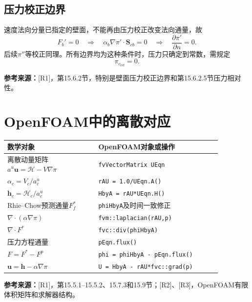 \documentclass[UTF8,12pt,a4paper]{ctexart}
\numberwithin{equation}{section}
\newcommand{\Rone}{\textnormal{[R1]}}
\newcommand{\Rtwo}{\textnormal{[R2]}}
\newcommand{\Rthree}{\textnormal{[R3]}}
\newcommand{\source}[1]{\par\smallskip\noindent\colorbox{sourcebg}{%
  \parbox{0.955\linewidth}{\footnotesize\color{sourcegray}\textbf{参考来源：}#1}}\par\smallskip}
\begin{document}
\subsection{压力校正边界}
速度法向分量已指定的壁面，不能再由压力校正改变法向通量，故
\begin{equation}
  F_b'=0
  \quad\Longrightarrow\quad
  \alpha_b\nabla\pi'\cdot\bm S_{cb}=0
  \quad\Longrightarrow\quad
  \boxed{\frac{\partial\pi'}{\partial n}=0.}
\end{equation}
后续$\pi''$等校正同理。所有边界均为这种条件时，压力只确定到常数，需规定
\begin{equation}
  \boxed{\pi_{c_{\mathrm{ref}}}=0.}
  \label{eq:pref}
\end{equation}
\source{\Rone，第15.6.2节，特别是壁面压力校正边界和第15.6.2.5节压力相对性。}

\section{OpenFOAM中的离散对应}
\begin{longtable}{p{0.37\linewidth}p{0.50\linewidth}}
\toprule
数学对象 & OpenFOAM对象或操作\\
\midrule
离散动量矩阵$a^u\bm u=\mathcal H-V\nabla\pi$ & \texttt{fvVectorMatrix UEqn}\\
$\alpha_c=V_c/a_c^u$ & \texttt{rAU = 1.0/UEqn.A()}\\
$\bm h_c=\mathcal H_c/a_c^u$ & \texttt{HbyA = rAU*UEqn.H()}\\
Rhie--Chow预测通量$F_f^*$ & \texttt{phiHbyA}及时间一致修正\\
$\nabla\cdot(\alpha\nabla\pi)$ & \texttt{fvm::laplacian(rAU,p)}\\
$\nabla\cdot F^*$ & \texttt{fvc::div(phiHbyA)}\\
压力方程通量 & \texttt{pEqn.flux()}\\
$F=F^*-F^p$ & \texttt{phi = phiHbyA - pEqn.flux()}\\
$\bm u=\bm h-\alpha\nabla\pi$ & \texttt{U = HbyA - rAU*fvc::grad(p)}\\
\bottomrule
\end{longtable}
\source{\Rone，第15.5.1--15.5.2、15.7.3和15.9节；\Rtwo、\Rthree，OpenFOAM有限体积矩阵和求解器结构。}
\end{document}
